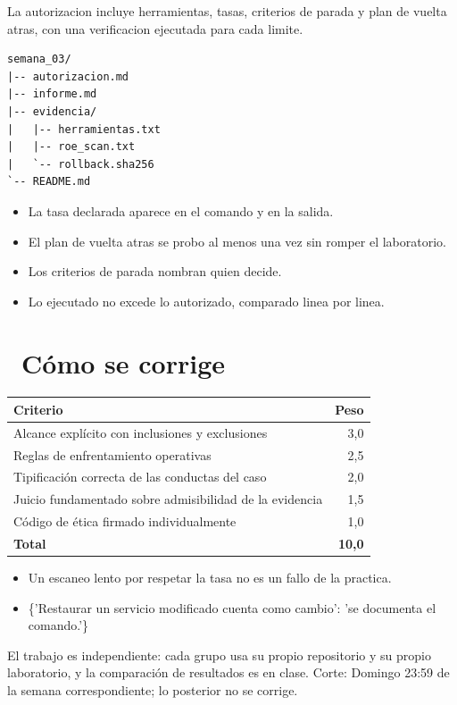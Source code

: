 \documentclass[11pt,a4paper]{article}
\newcommand{\iconotexto}[2]{\textcolor{cyanNeon}{\faIcon{#1}}~#2}
\begin{document}
La autorizacion incluye herramientas, tasas, criterios de parada y plan de vuelta atras, con una verificacion ejecutada para cada limite.

\begin{lstlisting}[style=estiloCodigo]
semana_03/
|-- autorizacion.md
|-- informe.md
|-- evidencia/
|   |-- herramientas.txt
|   |-- roe_scan.txt
|   `-- rollback.sha256
`-- README.md
\end{lstlisting}

\begin{itemize}[leftmargin=1.4em,itemsep=2pt,topsep=3pt]
  \item La tasa declarada aparece en el comando y en la salida.
  \item El plan de vuelta atras se probo al menos una vez sin romper el laboratorio.
  \item Los criterios de parada nombran quien decide.
  \item Lo ejecutado no excede lo autorizado, comparado linea por linea.
\end{itemize}

\section{\iconotexto{ruler-combined}{Cómo se corrige}}

\begin{tabularx}{\linewidth}{@{}X r@{}}
\toprule
Criterio & Peso\\
\midrule
Alcance explícito con inclusiones y exclusiones & 3,0 \\
Reglas de enfrentamiento operativas & 2,5 \\
Tipificación correcta de las conductas del caso & 2,0 \\
Juicio fundamentado sobre admisibilidad de la evidencia & 1,5 \\
Código de ética firmado individualmente & 1,0 \\
\midrule
\textbf{Total} & \textbf{10,0}\\
\bottomrule
\end{tabularx}

\begin{itemize}[leftmargin=1.4em,itemsep=2pt,topsep=3pt]
  \item Un escaneo lento por respetar la tasa no es un fallo de la practica.
  \item \{'Restaurar un servicio modificado cuenta como cambio': 'se documenta el comando.'\}
\end{itemize}

\begin{cajaRecuerda}El trabajo es independiente: cada grupo usa su propio repositorio y su propio laboratorio, y la comparación de resultados es en clase. Corte: Domingo 23:59 de la semana correspondiente; lo posterior no se corrige.
\end{cajaRecuerda}
\end{document}
